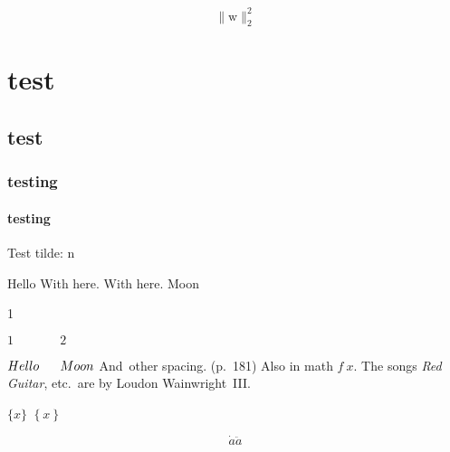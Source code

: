 \documentclass{minimal}
\begin{document}
$$\lVert \mathrm{w} \rVert_2^2$$

\chapter{test}

\section{test}

\subsection{testing}

\subsubsection{testing}

Test tilde: \tilde n

Hello
\thinspace
\medspace
\thickspace
\bigskip
\hspace{1em}
\hfill
\vspace{1em}
\vfill
With  here.
With  here.
Moon

1 \, \: \; \! \quad {}

$1 \, \: \; \! \quad \qquad 2$

$Hello
\thinspace
\medspace
\thickspace
\bigskip
\hspace{1em}
\hfill
\vspace{1em}
Moon$
And~other spacing. (p.~181) \citet[Sect.~3]{MyRef:2023}
Also in math $f~x$.
The songs \textit{Red Guitar}, etc.\ are by Loudon Wainwright~III\@.

$\{x\}$
$\left\{x\right\}$

\[
  \dot a
  \ddot a
\]
\end{document}
